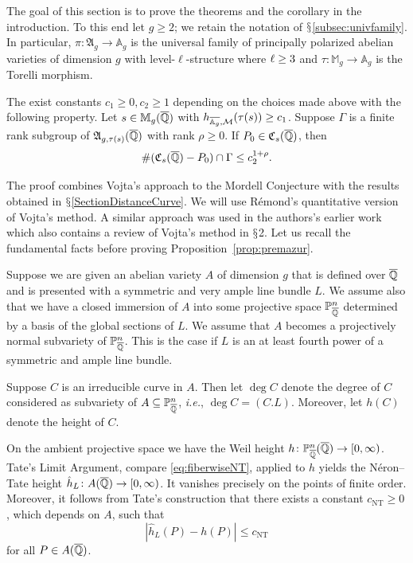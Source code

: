 
The goal of this section is to prove the theorems and the corollary in
the introduction. To this end let $g\ge 2$; we retain the notation of
$\mathsection$\ref{subsec:univfamily}. In particular,
$\pi\colon\mathfrak{A}_g\rightarrow \mathbb{A}_g$ is the universal
family of principally polarized abelian varieties of dimension $g$
with level-$\ell$-structure where $\ell\ge 3$ and
$\tau\colon \mathbb{M}_g\rightarrow \mathbb{A}_g$ is the Torelli morphism.

\begin{proposition}
  \label{prop:premazur}        
  The exist constants $c_1\ge 0,c_2\ge 1$ depending on the choices made
  above with the following property. Let $s\in \mathbb{M}_g({\overline{\mathbb{Q}}})$
  with $h_{\overline{\mathbb{A}_g},{\mathcal M}}(\tau(s)) \ge c_1$. Suppose $\Gamma$ is
  a finite rank subgroup of $\mathfrak{A}_{g,\tau(s)}({\overline{\mathbb{Q}}})$ with rank
  $\rho\ge 0$. If $P_0 \in \mathfrak{C}_s({\overline{\mathbb{Q}}})$, then
  $$
    \# (\mathfrak{C}_s({\overline{\mathbb{Q}}})-P_0)\cap \Gamma \le
    c_2^{1+\rho}.
  $$
\end{proposition}


The proof combines Vojta's approach to the Mordell Conjecture with the
results obtained in $\mathsection$\ref{SectionDistanceCurve}. We
will use R\'emond's quantitative
version~\cite{Remond:Decompte,remond:vojtasup} of Vojta's method. A
similar approach was used in the authors's earlier work~\cite{DGH1p}
which also contains a review of Vojta's method in $\mathsection$2. Let
us recall the fundamental facts before proving Proposition~\ref{prop:premazur}.

Suppose we are given an abelian variety $A$ of dimension $g$ that is
defined over ${\overline{\mathbb{Q}}}$ and is presented with a symmetric and very
ample line bundle $L$. We assume also that we have a closed immersion
of $A$ into some projective space ${\mathbb{P}}_{\overline{\mathbb{Q}}}^n$ determined by a basis
of the global sections of $L$. We assume that $A$ becomes a
projectively normal subvariety of ${\mathbb{P}}_{\overline{\mathbb{Q}}}^n$. This is the case if
$L$ is an at least fourth power of a symmetric and ample line bundle. 

Suppose $C$ is an irreducible  curve in $A$. Then let $\deg
C$ denote  the degree of $C$ considered as subvariety of
$A\subseteq {\mathbb{P}}_{\overline{\mathbb{Q}}}^n$, \textit{i.e.}, $\deg C = (C.L)$. Moreover, let $h(C)$ 
denote the height of $C$. 

On the ambient projective space  we have the 
 Weil height $h\colon
{\mathbb{P}}_{\overline{\mathbb{Q}}}^n({\overline{\mathbb{Q}}})\rightarrow [0,\infty)$. Tate's Limit Argument,
compare \eqref{eq:fiberwiseNT},
applied to $h$ yields the N\'eron--Tate height $\hat h_L\colon A({\overline{\mathbb{Q}}})\rightarrow
[0,\infty)$. It vanishes precisely on the points of finite order.
Moreover, it follows  from Tate's construction  that 
there exists a constant $c_{\mathrm{NT}}\ge 0$, which depends on $A$, such that
\begin{equation}
  \label{def:cNT}
  |\hat h_{L}(P) - h(P)|\le c_{\mathrm{NT}}
\end{equation}
for all $P\in A({\overline{\mathbb{Q}}})$.

